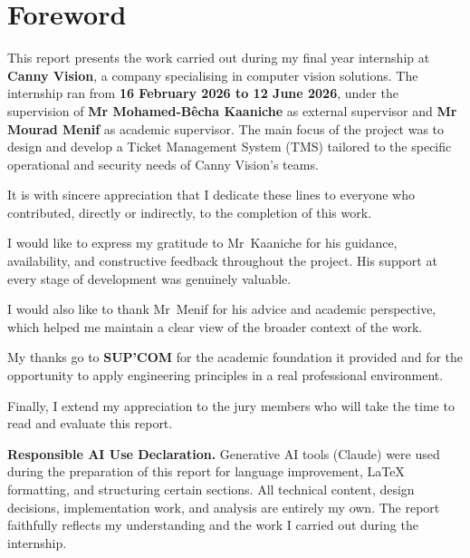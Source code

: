 \chapter*{Foreword}

This report presents the work carried out during my final year internship at \textbf{Canny Vision}, a company specialising in computer vision solutions. The internship ran from \textbf{16 February 2026 to 12 June 2026}, under the supervision of \textbf{Mr Mohamed-Bêcha Kaaniche} as external supervisor and \textbf{Mr Mourad Menif} as academic supervisor. The main focus of the project was to design and develop a Ticket Management System (TMS) tailored to the specific operational and security needs of Canny Vision's teams.

\bigskip

It is with sincere appreciation that I dedicate these lines to everyone who contributed, directly or indirectly, to the completion of this work.

I would like to express my gratitude to Mr~Kaaniche for his guidance, availability, and constructive feedback throughout the project. His support at every stage of development was genuinely valuable.

I would also like to thank Mr~Menif for his advice and academic perspective, which helped me maintain a clear view of the broader context of the work.

My thanks go to \textbf{SUP'COM} for the academic foundation it provided and for the opportunity to apply engineering principles in a real professional environment.

Finally, I extend my appreciation to the jury members who will take the time to read and evaluate this report.

\bigskip\bigskip

\noindent\textbf{Responsible AI Use Declaration.}
Generative AI tools (Claude) were used during the preparation of this report for language improvement, LaTeX formatting, and structuring certain sections. All technical content, design decisions, implementation work, and analysis are entirely my own. The report faithfully reflects my understanding and the work I carried out during the internship.
